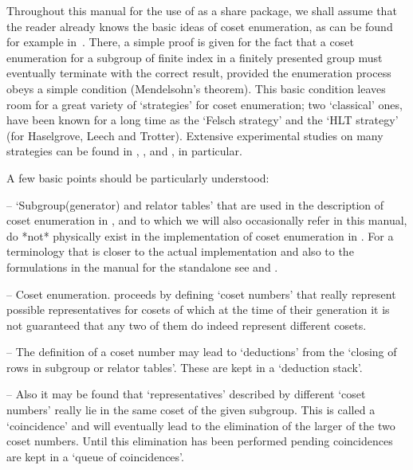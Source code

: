 Throughout this manual for the use of {\ACE} as a {\GAP} share package,
we shall assume that the reader already knows the basic ideas of coset
enumeration,  as  can be  found  for  example in~\cite{Neu82}.  There,
a  simple  proof  is  given  for the fact that a coset enumeration for
a  subgroup  of  finite  index  in a  finitely  presented  group  must
eventually terminate with the correct result, provided the enumeration
process obeys  a simple  condition (Mendelsohn's theorem).  This basic
condition leaves room for a great variety of \lq strategies' for coset
enumeration; two \lq classical' ones, have been known for a long  time
as the \lq Felsch  strategy' and the \lq HLT strategy' (for Haselgrove,
Leech  and Trotter). Extensive experimental studies on many strategies
can  be  found  in \cite{CDHW73},  \cite{Hav91}, and  \cite{HR99},  in 
particular.

A few basic points  should be particularly understood:

\beginlist

\item{--} \lq Subgroup(generator) and relator tables' that are used in
the description of coset enumeration  in \cite{Neu82}, and to which we
will  also occasionally  refer in  this manual,   do  *not* physically
exist    in the implementation of  coset enumeration in {\ACE}.  For a
terminology that  is closer to  the actual implementation and  also to
the  formulations  in  the   manual  for  the  {\ACE}  standalone  see
\cite{CDHW73} and \cite{Hav91}.

\item{--} Coset  enumeration. proceeds  by defining \lq coset numbers' 
that really represent possible representatives for cosets of  which at
the time of their generation it is not guaranteed that any two of them
do indeed represent different cosets.

\item{--} The definition of a coset number may lead to \lq deductions'
from the \lq closing of rows in subgroup or relator tables'. These are
kept in a \lq deduction stack'.

\item{--}  Also it may be found that \lq representatives' described by
different \lq coset  numbers' really lie in the same coset of the given
subgroup. This is called a \lq coincidence' and will eventually lead to
the elimination  of the larger of  the two coset  numbers.  Until this
elimination  has been  performed pending  coincidences are  kept  in a
\lq queue of coincidences'.

